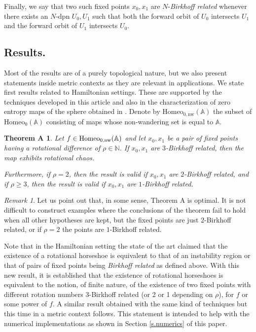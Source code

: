 \documentclass[12pt,a4paper]{amsart}
\newtheorem*{thmA}{Theorem A}
\theoremstyle{definition}
\theoremstyle{remark}
\newtheorem{obs}[thm]{Remark}
\newcommand{\N}{\mathbb{N}}
\newcommand{\homeo}{\mathrm{Homeo}_0(\A)}
\newcommand{\A}{\mathbb{A}}
\begin{document}
Finally, we say that two such fixed points $x_0,x_1$ are $N$-\emph{Birkhoff related}
whenever there exists an $N$-dpn $U_0,U_1$ such that both the forward orbit
of $U_0$ intersects $U_1$ and the forward orbit of $U_1$ intersects $U_0$.


\subsection{Results.}

Most of the results are of a purely topological nature, but we also present statements inside metric contexts
as they are relevant in applications.
We state first results related to Hamiltonian settings. These are supported by the techniques developed in this article and also in the characterization of zero entropy maps of the sphere obtained in %
 \cite{frankshandel, forcing, lecalveztal}. Denote by $\textrm{Homeo}_{0,\mathrm{nw}}(\A)$ the subset of $\homeo$ consisting of maps whose non-wandering set is equal to $\A$.

\begin{thmA}\label{t.mainconserv}
Let $f\in\textrm{\normalfont{Homeo}}_{0,\textrm{\normalfont{nw}}}(\A)$ and let $x_0,x_1$ be a pair of
fixed points having a rotational difference of $\rho\in\N$. If $x_0,x_1$
are $3$-Birkhoff related, then the map exhibits rotational chaos.

Furthermore, if $\rho= 2$, then the result is valid if $x_0,x_1$
are $2$-Birkhoff related, and if $\rho\ge 3$, then the result is valid if $x_0,x_1$
are $1$-Birkhoff related.
\end{thmA}

\begin{obs}
Let us point out that, in some sense, Theorem A is optimal. It is not difficult to construct examples where the conclusions of the theorem fail to hold when all other hypotheses are kept, but the fixed points are just $2$-Birkhoff related, or if $\rho=2$  the points are $1$-Birkhoff related.  
\end{obs}

Note that in the Hamiltonian setting the state of the art claimed that
the existence of a rotational horseshoe is equivalent to that of an instability region or that of pairs of fixed points being
\emph{Birkhoff related} as defined above. %
With this new result, it is established that the existence of rotational horseshoes
is equivalent to the notion, of finite nature, of the existence of two fixed points with different rotation numbers
$3$-Birkhoff related (or 2 or 1 depending on $\rho$), for $f$ or some power of $f$. 
A similar result obtained with
the same kind of techniques but this time in a metric context follows.
This statement is intended to help with the numerical implementations
as shown in Section \ref{s.numerics} of this paper. 
\end{document}

